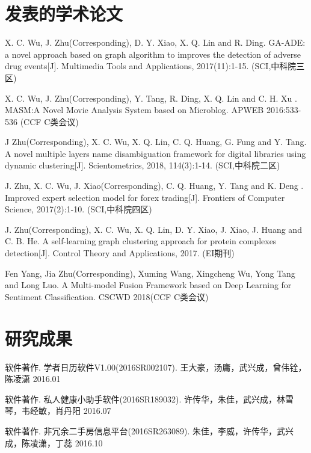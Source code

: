 ﻿\begin{resume}

  \section*{发表的学术论文} %

  \begin{enumerate}[{[}1{]}]
  \addtolength{\itemsep}{-.36\baselineskip}%
  
   \item X. C. Wu, J. Zhu(Corresponding), D. Y. Xiao, X. Q. Lin and R. Ding. GA-ADE: a novel approach based on graph algorithm to improves the detection of adverse drug events[J]. Multimedia Tools and Applications, 2017(11):1-15. (SCI,中科院三区)
   \item X. C. Wu, J. Zhu(Corresponding), Y. Tang, R. Ding, X. Q. Lin and C. H. Xu . MASM:A Novel Movie Analysis System based on Microblog. APWEB 2016:533-536 (CCF C类会议)
   \item J Zhu(Corresponding), X. C. Wu, X. Q. Lin, C. Q. Huang, G. Fung and Y. Tang. A novel multiple layers name disambiguation framework for digital libraries using dynamic clustering[J]. Scientometrics, 2018, 114(3):1-14. (SCI,中科院二区)
   \item J. Zhu, X. C. Wu, J. Xiao(Corresponding), C. Q. Huang, Y. Tang and K. Deng . Improved expert selection model for forex trading[J]. Frontiers of Computer Science, 2017(2):1-10. (SCI,中科院四区)
   \item J. Zhu(Corresponding), X. C. Wu, X. Q. Lin, D. Y. Xiao, J. Xiao, J. Huang and C. B. He. A self-learning graph clustering approach for protein complexes detection[J]. Control Theory and Applications, 2017. (EI期刊)
   \item Fen Yang, Jia Zhu(Corresponding), Xuming Wang, Xingcheng Wu, Yong Tang
	and Long Luo. A Multi-model Fusion Framework based on Deep Learning for
	Sentiment Classification.  CSCWD 2018(CCF C类会议)
  \end{enumerate}

  \section*{研究成果} %
  \begin{enumerate}[{[}1{]}]
  \addtolength{\itemsep}{-.36\baselineskip}%
  
    \item 软件著作. 学者日历软件V1.00(2016SR002107). 王大豪，汤庸，武兴成，曾伟铨，陈凌潇 2016.01
    \item 软件著作. 私人健康小助手软件(2016SR189032). 许传华，朱佳，武兴成，林雪琴，韦经敏，肖丹阳 2016.07
    \item 软件著作. 非冗余二手房信息平台(2016SR263089). 朱佳，李威，许传华，武兴成，陈凌潇，丁蕊 2016.10

  \end{enumerate}
\end{resume}
